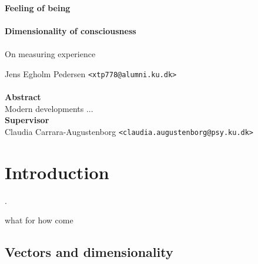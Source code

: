 \documentclass[a4paper,oneside]{memoir}
\begin{document}
    \thispagestyle{empty}
    \begin{adjustwidth}{-3cm}{-1.5cm}
    \vspace*{-1cm}
    \textbf{\Huge Feeling of being} \\
    \vspace*{2.5cm} \\
    \textbf{\Huge Dimensionality of consciousness} \\
    \vspace*{.1cm} \\
    {\huge On measuring experience} \\
    \begin{tabbing}
    Jens Egholm Pedersen \hspace{1cm} \= \texttt{<xtp778@alumni.ku.dk>} \\
    \\[2cm]
    \textbf{\Large Abstract} \\
    Modern developments ...
    \\[6cm]

    \textbf{\Large Supervisor} \\
    Claudia Carrara-Augustenborg \hspace{1cm} \texttt{<claudia.augustenborg@psy.ku.dk>} \\
    \end{tabbing}
    \end{adjustwidth}
    \newpage
    \ClearWallPaper

\chapter{Introduction}


\autocite{dennett2017}.

what for
how come

\section{Vectors and dimensionality}
\end{document}
